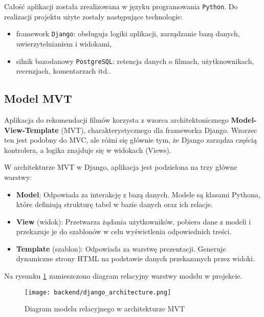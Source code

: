\documentclass[../main.tex]{subfiles}
\begin{document}
Całość aplikacji została zrealizowana w języku programowania \texttt{Python}. Do realizacji projektu użyte zostały następujące technologie:
\begin{itemize}
	\item framework \texttt{Django}: obsługuja logiki aplikacji, zarządzanie bazą danych, uwierzytelnianiem i widokami,
	\item silnik bazodanowy \texttt{PostgreSQL}: retencja danych o filmach, użytknownikach, recenzjach, komentarzach itd..
\end{itemize}

\subsection{Model MVT}

Aplikacja do rekomendacji filmów korzysta z wzorca architektonicznego \textbf{Model-View-Template} (MVT), charakterystycznego dla frameworka Django. Wzorzec ten jest podobny do MVC, ale różni się głównie tym, że Django zarządza częścią kontrolera, a logika znajduje się w widokach (Views).

W architekturze MVT w Django, aplikacja jest podzielona na trzy główne warstwy:
\begin{itemize}
	\item \textbf{Model}: Odpowiada za interakcję z bazą danych. Modele są klasami Pythona, które definiują strukturę tabel w bazie danych oraz ich relacje.
	\item \textbf{View} (widok): Przetwarza żądania użytkowników, pobiera dane z modeli i przekazuje je do szablonów w celu wyświetlenia odpowiednich treści.
	\item \textbf{Template} (szablon): Odpowiada za warstwę prezentacji. Generuje dynamiczne strony HTML na podstawie danych przekazanych przez widoki.
\end{itemize}

Na rysunku \ref{fig:backend:model_diagram} zamieszczono diagram relacyjny warstwy modelu w projekcie.

\begin{figure}[htb]
	\centering
	\texttt{[image: backend/django\_architecture.png]}

	\caption{Diagram modelu relacyjnego w architekturze MVT}
	\label{fig:backend:model_diagram}
\end{figure}
\end{document}
